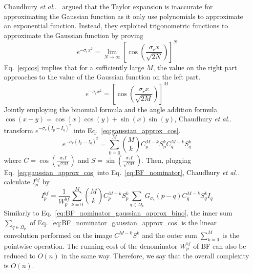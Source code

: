 \documentclass[twocolumn]{el-author}
\makeatletter
\DeclareRobustCommand\onedot{\futurelet\@let@token\@onedot}
\def\@onedot{\ifx\@let@token.\else.\null\fi\xspace}
\def\etal{\emph{et al}\onedot}
\makeatother
\begin{document}
Chaudhury \etal~\cite{Chaudhury_TIP_2011} argued that the Taylor expansion is inaccurate for approximating the Gaussian function as it only use polynomials to approximate an exponential function. Instead, they exploited trigonometric functions to approximate the Gaussian function by proving
%
\begin{equation}
e^{- \sigma_r x^2} = \lim_{N \rightarrow \infty } \left [ \cos \left ( \frac{ \sigma_r x}{\sqrt{2N}} \right ) \right ]^N
\label{eq:cos}
\end{equation}
%
Eq.~\eqref{eq:cos} implies that for a sufficiently large $M$, the value on the right part approaches to the value of the Gaussian function on the left part.
%
\begin{equation}
e^{- \sigma_r x^2} =  \left [ \cos \left ( \frac{ \sigma_r x}{\sqrt{2M}} \right ) \right ]^M
\label{eq:cos_approx}
\end{equation}
%
Jointly employing the binomial formula and the angle addition formula $\cos (x-y)=\cos (x) \cos (y) + \sin (x) \sin (y)$, Chaudhury \etal transform $e^{-{\sigma_r}{(I_p - I_q)^2}}$ into Eq.~\eqref{eq:gaussian_approx_cos}.
%
\begin{equation}
e^{-{\sigma_r}{(I_p - I_q)^2}} = \sum_{k=0}^M { M \choose k} C_p^{M-k} S_p^k C_q^{M-k} S_q^k
\label{eq:gaussian_approx_cos}
\end{equation}
%
where $C = \cos \left ( \frac{ \sigma_r I}{\sqrt{2M}} \right ) $ and $S = \sin \left ( \frac{ \sigma_r I}{\sqrt{2M}} \right ) $. Then, plugging Eq.~\eqref{eq:gaussian_approx_cos} into Eq.~\eqref{eq:BF_nominator}, Chaudhury \etal calculate $I_p^{bf}$ by
%
\begin{equation}
I_p^{bf} = \frac{1}{W^{bf}_{p}} \sum_{k=0}^M { M \choose k} C_p^{M-k} S_p^k \sum_{q \in \Omega_p} G_{\sigma_s} (p-q) C_q^{M-k} S_q^k {I_q}
\label{eq:BF_nominator_gaussian_approx_cos}
\end{equation}
%
Similarly to Eq.~\eqref{eq:BF_nominator_gaussian_approx_bino}, the inner sum $\sum_{q \in \Omega_p}$ of Eq.~\eqref{eq:BF_nominator_gaussian_approx_cos} is the
linear convolution performed on the image $C^{M-k}S^k$ and the outer sum $\sum_{k=0}^M$ is the pointwise operation. The running cost of the denominator $W^{bf}_{p}$ of BF can also be reduced to $O(n)$ in the same way. Therefore, we say that the overall complexity is $O(n)$.
\end{document}

